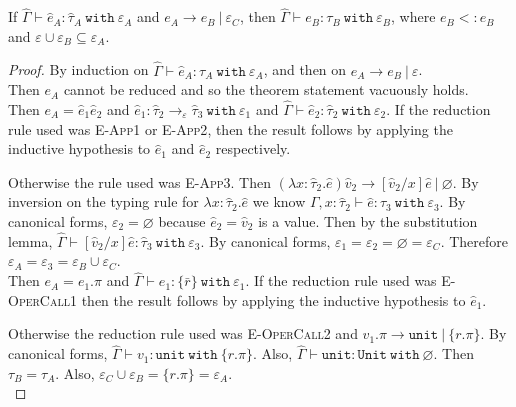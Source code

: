 \documentclass{llncs}
\newcommand{\keywadj}[1]{\mathtt{#1}}
\newcommand{\keyw}[1]{\keywadj{#1}~}
\newcommand{\kw}[1]{\keyw{ #1 }}
\newcommand{\kwa}[1]{\keywadj{ #1 }}
\begin{document}
\hrulefill

\begin{theorem}[Preservation]
If $\hat \Gamma \vdash \hat e_A: \hat \tau_A~\kw{with} \varepsilon_A$ and $e_A \longrightarrow e_B~|~\varepsilon_C$, then $\hat \Gamma \vdash e_B: \tau_B~\kw{with} \varepsilon_B$, where $e_B <: e_B$ and $\varepsilon \cup \varepsilon_B \subseteq \varepsilon_A$.
\end{theorem}

\begin{proof}
By induction on $\hat \Gamma \vdash \hat e_A: \tau_A~\kw{with }\varepsilon_A$, and then on $e_A \longrightarrow e_B~|~\varepsilon$. \\

\noindent
{} Then $e_A$ cannot be reduced and so the theorem statement vacuously holds. \\

\noindent
{}
Then $e_A = \hat e_1 \hat e_2$ and $\hat e_1: \hat \tau_2 \rightarrow_{\varepsilon} \hat \tau_3~\kw{with} \varepsilon_1$ and $\hat \Gamma \vdash \hat e_2: \hat \tau_2~\kw{with} \varepsilon_2$. If the reduction rule used was \textsc{E-App1} or \textsc{E-App2}, then the result follows by applying the inductive hypothesis to $\hat e_1$ and $\hat e_2$ respectively.

Otherwise the rule used was \textsc{E-App3}. Then $(\lambda x: \hat \tau_2.\hat e)\hat v_2 \longrightarrow [\hat v_2/x]\hat e~|~\varnothing$. By inversion on the typing rule for $\lambda x: \hat \tau_2.\hat e$ we know $\Gamma, x: \hat \tau_2 \vdash \hat e: \hat \tau_3~\kw{with} \varepsilon_3$. By canonical forms, $\varepsilon_2 = \varnothing$ because $\hat e_2 = \hat v_2$ is a value. Then by the substitution lemma, $\hat \Gamma \vdash [\hat v_2/x]\hat e : \hat \tau_3~\kw{with} \varepsilon_3$. By canonical forms, $\varepsilon_1 = \varepsilon_2 = \varnothing = \varepsilon_C$. Therefore $\varepsilon_A = \varepsilon_3 = \varepsilon_B \cup \varepsilon_C$.\\

\noindent
{}
Then $e_A = e_1.\pi$ and $\hat \Gamma \vdash e_1 : \{ \bar r \}~\kw{with} \varepsilon_1$. If the reduction rule used was \textsc{E-OperCall1} then the result follows by applying the inductive hypothesis to $\hat e_1$.

Otherwise the reduction rule used was \textsc{E-OperCall2} and $v_1.\pi \longrightarrow \kwa{unit}~|~\{ r.\pi \}$. By canonical forms, $\hat \Gamma \vdash v_1: \kwa{unit}~\kw{with} \{ r.\pi \}$. Also, $\hat \Gamma \vdash \kwa{unit}: \kwa{Unit}~\kw{with} \varnothing$. Then $\tau_B = \tau_A$. Also, $\varepsilon_C \cup \varepsilon_B = \{ r.\pi \} = \varepsilon_A$.\\


\end{proof}
\end{document}
